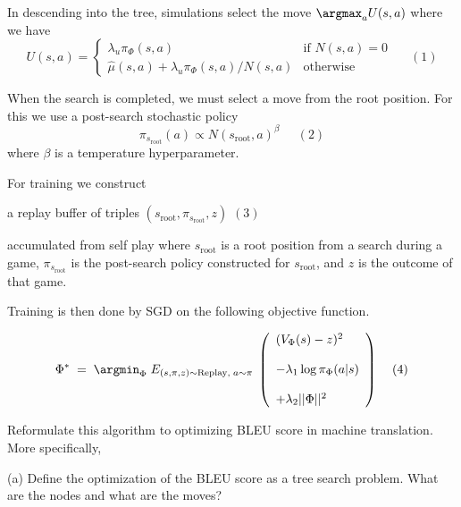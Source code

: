 \documentclass{article}
\newcommand{\solution}[1]{}
\begin{document}
\medskip
In descending into the tree, simulations select the move $\argmax_a U(s,a)$ where we have
$$U(s,a) =  \left\{\begin{array}{ll}\lambda_u \pi_\Phi(s,a) &\mbox{if $N(s,a) = 0$} \\ \hat{\mu}(s,a) + \lambda_u \pi_\Phi(s,a)/N(s,a) & \mbox{otherwise} \end{array}\right.\;\;\;\;\;(1)$$

\medskip
When the search is completed, we must select a move from the root position.  For this we use a post-search stochastic policy
$$\pi_{s_{\mathrm{root}}}(a) \propto N(s_{\mathrm{root}},a)^\beta\;\;\;\;\;(2)$$
where $\beta$ is a temperature hyperparameter.

\medskip
For training we construct

\medskip
\centerline{a replay buffer of triples $(s_{\mathrm{root}},\pi_{s_{\mathrm{root}}},z)$ \hspace{2em}$(3)$}

\medskip
accumulated from self play where $s_{\mathrm{root}}$ is a root position from a search during a game,
$\pi_{s_{\mathrm{root}}}$ is the post-search policy constructed for $s_{\mathrm{root}}$, and $z$ is the outcome of that game.

\medskip
Training is then done by SGD on the following objective function.

$$\Phi^*\; = \;\argmin_\Phi \;E_{(s,\pi,z) \sim \mathrm{Replay},\;a \sim \pi}\;\left(\begin{array}{l} (V_\Phi(s) - z)^2 \\ \\ - \lambda_1\log \pi_\Phi(a|s) \\ \\ + \lambda_2||\Phi||^2\end{array}\right)\;\;\;\;(4)$$

\bigskip


Reformulate this algorithm to optimizing BLEU score in machine translation. More specifically,

\medskip
(a) Define the optimization of the BLEU score as a tree search problem.  What are the nodes and what are the moves?

\solution{
    The tree is defined by sequentially choosing words. Each node correspond to a sequences of moves --- a node at depth $d$ in the tree corresponds to a prefix of length $d$ (the first $d$ words)
    of a possible translation.  The moves from a given node correspond to the choice of the next word.
    }
\end{document}

